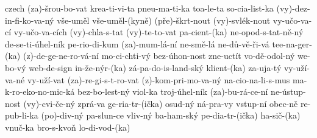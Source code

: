 \begin{hyphenrules}{czech}
{ (za)-šrou-bo-vat
 krea-ti-vi-ta
 pneu-ma-ti-ka
 toa-le-ta
 so-cia-list-ka
 (vy)-dez-in-fi-ko-va-ný
 vše-uměl
 vše-uměl-(kyně)
 (pře)-škrt-nout
 (vy)-svlék-nout
 vy-učo-va-cí
 vy-učo-va-cích
 (vy)-chla-s-tat
 (vy)-te-to-vat
 pa-cient-(ka)
 ne-opod-s-tat-ně-ný
 de-se-ti-úhel-ník
 pe-rio-di-kum
 (za)-mum-lá-ní
 ne-smě-lá
 ne-dů-vě-ři-vá
 tee-na-ger-(ka)
 (z)-de-ge-ne-ro-vá-ní
 mo-ci-chti-vý
 bez-úhon-nost
 zne-uctít
 vo-dě-odol-ný
 we-bo-vý
 web-de-sign
 in-že-nýr-(ka)
 zá-pa-do-is-land-ský
 klient-(ka)
 za-uja-tý
 vy-uží-va-né
 vy-uží-vat
 (za)-re-gi-s-t-ro-vat
 (z)-kom-pri-mo-va-ný
 na-cio-na-li-s-mus
 ma-k-ro-eko-no-mic-ká
 bez-bo-lest-ný
 viol-ka
 troj-úhel-ník
 (za)-bu-rá-ce-ní
 ne-ústup-nost
 (vy)-cvi-če-ný
 zprá-va
 ge-ria-tr-(ička)
 osud-ný
 ná-pra-vy
 vstup-ní
 obec-ně
 re-pub-li-ka
 (po)-div-ný
 pa-slun-ce
 vliv-ný
 ba-ham-ský
 pe-dia-tr-(ička)
 ha-sič-(ka)
 vnuč-ka
 bro-s-kvoň
 lo-di-vod-(ka)
  }
\end{hyphenrules}
